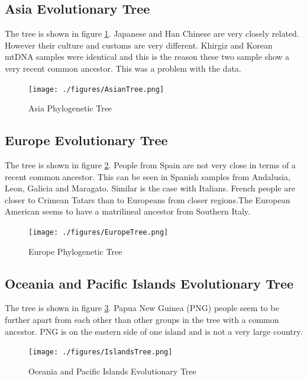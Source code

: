 \documentclass[conference]{IEEEtran}
\begin{document}
\FloatBarrier
\subsection{Asia Evolutionary Tree}

The tree is shown in figure \ref{AsianTree}. Japanese and Han Chinese are very closely related. However their culture and customs are very different. Khirgiz and Korean mtDNA samples were identical and this is the reason these two sample show a very recent common ancestor. This was a problem with the data.

\begin{figure}[!t]
\centering
\texttt{[image: ./figures/AsianTree.png]}
\caption{Asia Phylogenetic Tree}
\label{AsianTree}
\end{figure}

\FloatBarrier
\subsection{Europe Evolutionary Tree}

The tree is shown in figure \ref{EuropeTree}. People from Spain are not very close in terms of a recent common ancestor. This can be seen in Spanish samples from Andalusia, Leon, Galicia and Maragato. Similar is the case with Italians. French people are closer to Crimean Tatars than to Europeans from closer regions.The European American seems to have a matrilineal ancestor from Southern Italy.


\begin{figure}[!t]
\centering
\texttt{[image: ./figures/EuropeTree.png]}
\caption{Europe Phylogenetic Tree}
\label{EuropeTree}
\end{figure}

\FloatBarrier
\subsection{Oceania and Pacific Islands Evolutionary Tree}

The tree is shown in figure \ref{IslandsTree}. Papua New Guinea (PNG) people seem to be further apart from each other than other groups in the tree with a common ancestor.
PNG is on the eastern side of one island and is not a very large country.

\begin{figure}[!t]
\centering
\texttt{[image: ./figures/IslandsTree.png]}
\caption{Oceania and Pacific Islands Evolutionary Tree}
\label{IslandsTree}
\end{figure}
\end{document}
